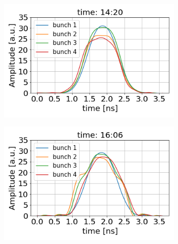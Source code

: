 \begin{figure}[!ht]
   \centering
   \begin{subfigure}[t]{0.42\textwidth}
       \centering
       \includegraphics[width=1\textwidth]{./images/Ch5/bunchProfiles_MD_115.png}
   \end{subfigure}
   \hfill
   \begin{subfigure}[t]{0.42\textwidth}
       \centering
       \includegraphics[width=1 \textwidth]{./images/Ch5/bunchProfiles_MD_126.png}
   \end{subfigure}
   \hfill
   \begin{subfigure}[t]{0.42\textwidth}
       \centering

\end{subfigure}
\end{figure}
